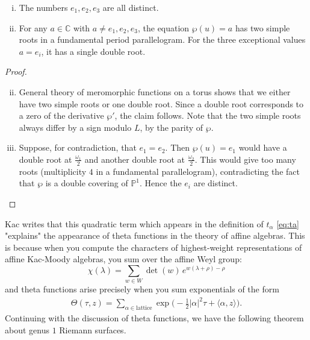\documentclass[12pt]{article}
\begin{document}
\begin{proposition}\label{prop:wp-map}
\leavevmode
\begin{enumerate}[(i)]
    \item The numbers $e_1,e_2,e_3$ are all distinct.
    \item For any $a \in \mathbb{C}$ with $a \neq e_1,e_2,e_3$, the equation $\wp(u)=a$ has two simple roots in a fundamental period parallelogram. For the three exceptional values $a=e_i$, it has a single double root.
\end{enumerate}
\end{proposition}

\begin{proof}
\leavevmode
\begin{enumerate}[(i)]
    \setcounter{enumi}{1}
    \item General theory of meromorphic functions on a torus shows that we either have two simple roots or one double root. Since a double root corresponds to a zero of the derivative $\wp'$, the claim follows. Note that the two simple roots always differ by a sign modulo $L$, by the parity of $\wp$.
    
    \setcounter{enumi}{0}
    \item Suppose, for contradiction, that $e_1=e_2$. Then $\wp(u)=e_1$ would have a double root at $\tfrac{\omega_1}{2}$ and another double root at $\tfrac{\omega_2}{2}$. This would give too many roots (multiplicity $4$ in a fundamental parallelogram), contradicting the fact that $\wp$ is a double covering of $\mathbb{P}^1$. Hence the $e_i$ are distinct.
\end{enumerate}
\end{proof}
\begin{remark}
    Kac writes that this quadratic term which appears in the definition of $t_\alpha$ \ref{eq:ta} "explains" the appearance of theta functions in the theory of affine algebras. This is because when you compute the characters of highest-weight representations of affine Kac-Moody algebras, you sum over the affine Weyl group:
\[\chi(\lambda) = \sum_{w \in W} \det(w)\, e^{w(\lambda+\rho) - \rho}\]
and theta functions arise precisely when you sum exponentials of the form \begin{align*}
    \Theta(\tau, z) = \sum_{\alpha \in \text{lattice}} \exp\!\big(-\tfrac{1}{2}|\alpha|^2 \tau + \langle \alpha, z\rangle\big).
\end{align*}
Continuing with the discussion of theta functions, we have the following theorem about genus $1$ Riemann surfaces.
\end{remark}
\end{document}
